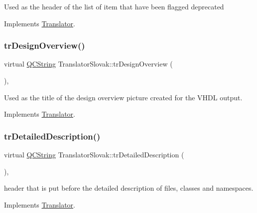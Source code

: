 Used as the header of the list of item that have been flagged deprecated 

Implements \mbox{\hyperlink{class_translator}{Translator}}.

\mbox{\label{class_translator_slovak_af6d3551443e34355a52d196c826af1df}} 
\subsubsection{\texorpdfstring{trDesignOverview()}{trDesignOverview()}}
{\footnotesize\ttfamily virtual \mbox{\hyperlink{class_q_c_string}{Q\+C\+String}} Translator\+Slovak\+::tr\+Design\+Overview (\begin{DoxyParamCaption}{ }\end{DoxyParamCaption})\hspace{0.3cm}{\ttfamily [inline]}, {\ttfamily [virtual]}}

Used as the title of the design overview picture created for the V\+H\+DL output. 

Implements \mbox{\hyperlink{class_translator}{Translator}}.

\mbox{\label{class_translator_slovak_a33658a3393cb99b1dd159236376e24df}} 
\subsubsection{\texorpdfstring{trDetailedDescription()}{trDetailedDescription()}}
{\footnotesize\ttfamily virtual \mbox{\hyperlink{class_q_c_string}{Q\+C\+String}} Translator\+Slovak\+::tr\+Detailed\+Description (\begin{DoxyParamCaption}{ }\end{DoxyParamCaption})\hspace{0.3cm}{\ttfamily [inline]}, {\ttfamily [virtual]}}

header that is put before the detailed description of files, classes and namespaces. 

Implements \mbox{\hyperlink{class_translator}{Translator}}.

\mbox{\label{class_translator_slovak_a5a9359d16b835517e7b9139f53dbc8db}} 
